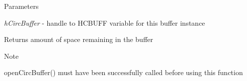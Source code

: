 \begin{DoxyParams}{Parameters}
\item[{\em hCircBuffer}]-\/ handle to HCBUFF variable for this buffer instance\end{DoxyParams}
\begin{DoxyReturn}{Returns}
amount of space remaining in the buffer
\end{DoxyReturn}
\begin{DoxyNote}{Note}

\begin{DoxyEnumerate}
\item openCircBuffer() must have been successfully called before using this function 
\end{DoxyEnumerate}
\end{DoxyNote}
